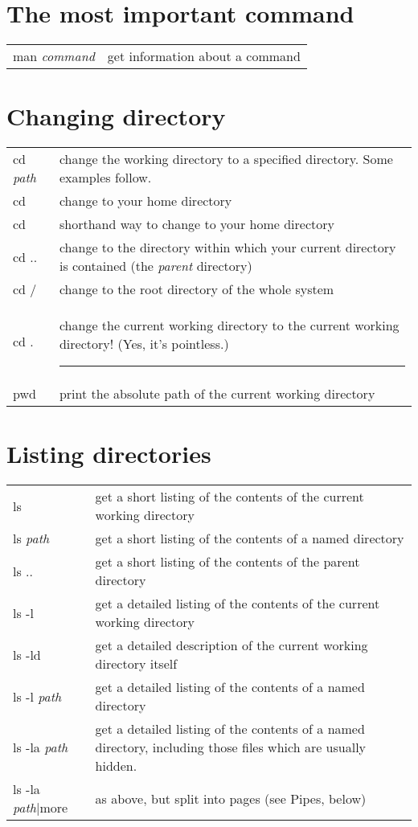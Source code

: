 \documentclass[twocolumn]{article}
\begin{document}
\section{The most important command}
\begin{tabular}{l|p{2in}}
man \emph{command} & get information about a command
\end{tabular}


\section{Changing directory}
\begin{tabular}{l|p{2in}}
cd \emph{path} & change the working directory to a specified directory. Some
examples follow.\\
cd ~ & change to your home directory  \\
cd & shorthand way to change to your home directory \\
cd .. & change to the directory within which your current directory 
is contained (the \emph{parent} directory)\\
cd / & change to the root directory of the whole system\\
cd . & change the current working directory to the current working
directory! (Yes, it's pointless.) \hrule \\
pwd & print the absolute path of the current working directory
\end{tabular}

\section{Listing directories}
\begin{tabular}{l|p{2in}}
ls & get a short listing of the contents of the current working directory\\
ls \emph{path} & get a short listing of the contents of a named directory\\
ls .. & get a short listing of the contents of the parent directory\\
ls -l & get a detailed listing of the contents of the current working
directory\\
ls -ld & get a detailed description of the current working directory itself\\
ls -l \emph{path} & get a detailed listing of the contents of a named directory\\
ls -la \emph{path} & get a detailed listing of the contents of a named directory, including those files which are usually hidden.\\
ls -la \emph{path}|more & as above, but split into pages (see Pipes, below)
\end{tabular}
\end{document}
